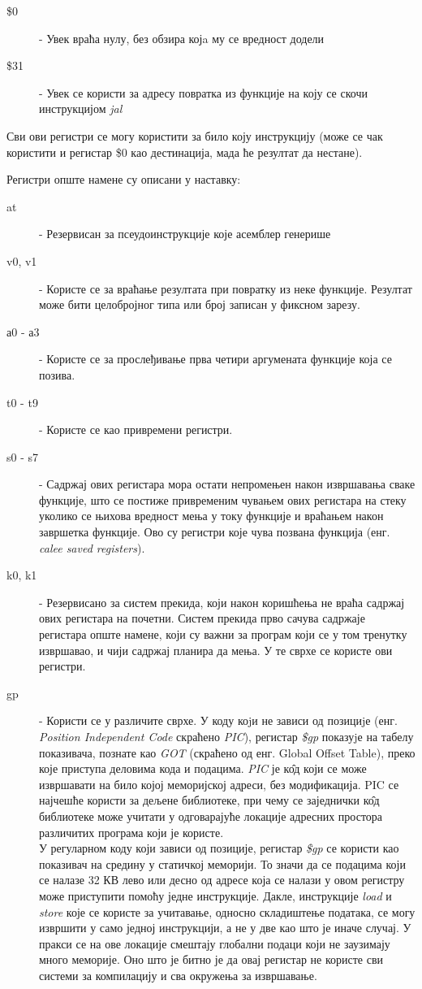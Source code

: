 \documentclass[12pt,oneside]{memoir}
\begin{document}
\begin{description}
  \item[\$0] - Увек враћа нулу, без обзира којa му се вредност додели
  \item [\$31] - Увек се користи за адресу повратка из функције на коју се скочи инструкцијом \textit{jal}
\end{description}
Сви ови регистри се могу користити за било коју инструкцију (може се чак користити и регистар \$0 као дестинација, мада ће резултат да нестане). 

Регистри опште намене су описани у наставку:
\begin{description}
  \item[at] - Резервисан за псеудоинструкције које асемблер генерише
  \item[v0, v1] - Користе се за враћање резултата при повратку из неке функције. Резултат може бити целобројног типа или број записан у фиксном зарезу.
  \item[а0 - а3] - Користе се за прослеђивање прва четири аргумената функције која се позива.
  \item[t0 - t9] - Користе се као привремени регистри. 
  \item[s0 - s7] - Садржај ових регистара мора остати непромењен након извршавања сваке функције, што се постиже привременим чувањем ових регистара на стеку уколико се њихова вредност мења у току функције и враћањем након завршетка функције. Ово су регистри које чува позвана функција (енг. \textit{calee saved registers}).
  \item[k0, k1] - Резервисано за систем прекида, који након коришћења не враћа садржај ових регистара на почетни. Систем прекида прво сачува садржаје регистара опште намене, који су важни за програм који се у том тренутку извршавао, и чији садржај планира да мења. У те сврхе се користе ови регистри.
  \item[gp] - Користи се у различите сврхе. У коду коjи не зависи од позициjе (енг. \textit{Position Independent Code} скраћено \textit{PIC}), регистар \textit{\$gp} показуjе на табелу показивача, познате као \textit{GOT} (скраћено од енг. Global Offset Table), преко које приступа деловима кода и подацима. \textit{PIC} је к\^{о}д који се може извршавати на било којој меморијској адреси, без модификација. PIC се најчешће користи за дељене библиотеке, при чему се заједнички к\^{о}д библиотеке може учитати у одговарајуће локације адресних простора различитих програма који је користе. \\
  У регуларном коду који зависи од позиције, регистар \textit{\$gp} се користи као показивач на средину у статичкој меморији. То значи да се подацима који се налазе 32 КВ лево или десно од адресе која се налази у овом регистру може приступити помоћу једне инструкције. Дакле, инструкције \textit{load} и \textit{store} које се користе за учитавање, односно складиштење података, се могу извршити у само једној инструкцији, а не у две као што је иначе случај. У пракси се на ове локације смештају глобални подаци који не заузимају много меморије. Оно што је битно је да овај регистар не користе сви системи за компилацију и сва окружења за извршавање.

\end{description}
\end{document}
